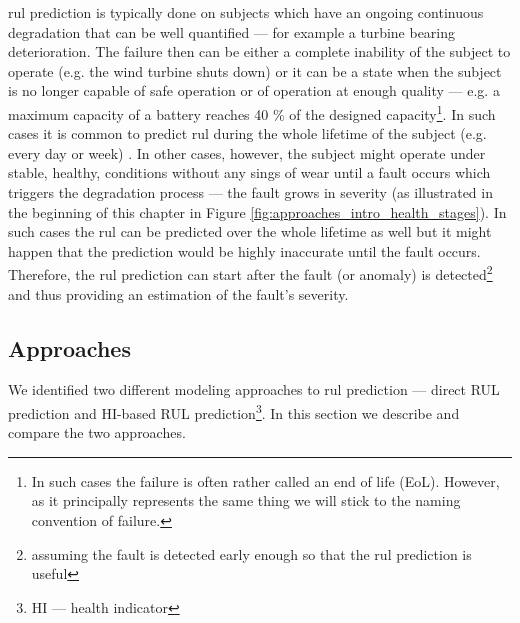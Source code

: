 \Acrshort{rul} prediction is typically done on subjects which have an ongoing continuous degradation that can be well quantified --- for example a turbine bearing deterioration.
The failure then can be either a complete inability of the subject to operate (e.g. the wind turbine shuts down) or it can be a state when the subject is no longer capable of safe operation or of operation at enough quality --- e.g. a maximum capacity of a battery reaches 40 \% of the designed capacity\footnote{In such cases the failure is often rather called an end of life (EoL). However, as it principally represents the same thing we will stick to the naming convention of failure.}.
In such cases it is common to predict \acrshort{rul} during the whole lifetime of the subject (e.g. every day or week) \cite{miao2013remaining}.
In other cases, however, the subject might operate under stable, healthy, conditions without any sings of wear until a fault occurs which triggers the degradation process --- the fault grows in severity (as illustrated in the beginning of this chapter in Figure \ref{fig:approaches_intro_health_stages}).
In such cases the \acrshort{rul} can be predicted over the whole lifetime as well but it might happen that the prediction would be highly inaccurate until the fault occurs.
Therefore, the \acrshort{rul} prediction can 
start after the fault (or anomaly) is detected\footnote{assuming the fault is detected early enough so that the \acrshort{rul} prediction is useful} \cite{lei2018machinery} and thus providing an estimation of the fault's severity.

\subsection{Approaches}
\label{sec:approaches_rul_approaches}

We identified two different modeling approaches to \acrshort{rul} prediction --- direct RUL prediction and HI-based RUL prediction\footnote{HI --- health indicator}.
In this section we describe and compare the two approaches.


